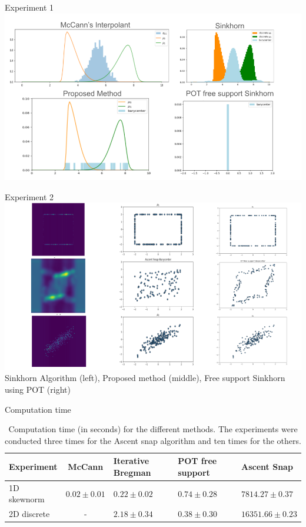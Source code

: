 \begin{frame}{Experiment 1}
    \centering
    \includegraphics[width=\textwidth]{figures/experiment1_results.png}
\end{frame}

\begin{frame}{Experiment 2}
    \centering
    \includegraphics[width=\textwidth]{figures/experiment2_results.png}
    Sinkhorn Algorithm (left), Proposed method (middle), Free support Sinkhorn using POT (right)
\end{frame}

\begin{frame}{Computation time}
    \begin{table}
        \begin{center}
            \begin{tabularx}{\textwidth}{>{\raggedright}m{2cm} c m{2cm} X X}
                    Experiment & McCann & Iterative Bregman & POT free support & Ascent Snap \\
                    \hline\hline
                    1D skewnorm & $0.02 \pm 0.01$ & $0.22 \pm 0.02$ & $0.74 \pm 0.28$ & $7814.27 \pm 0.37$ \\
                    2D discrete & - & $2.18 \pm 0.34$ & $0.38 \pm 0.30$ & $16351.66 \pm 0.23$ \\
            \end{tabularx}
        \end{center}
        \caption{Computation time (in seconds) for the different methods. The experiments were conducted three times for the Ascent snap algorithm and ten times for the others.}
    \end{table}
\end{frame}

